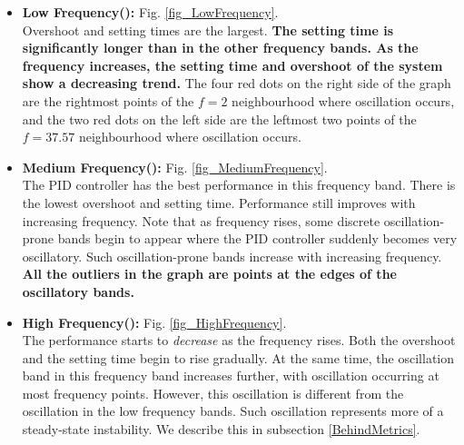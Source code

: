 \documentclass[conference]{IEEEtran}
\begin{document}
\begin{itemize}
    \item \textbf{Low Frequency():} Fig. \ref{fig_LowFrequency}.
        \\Overshoot and setting times are the largest. \textbf{The setting time is significantly longer than in the other frequency bands. As the frequency increases, the setting time and overshoot of the system show a decreasing trend.} The four red dots on the right side of the graph are the rightmost points of the $f=2$ neighbourhood where oscillation occurs, and the two red dots on the left side are the leftmost two points of the $f=37.57$ neighbourhood where oscillation occurs. 
    \item \textbf{Medium Frequency():} Fig. \ref{fig_MediumFrequency}.
        \\The PID controller has the best performance in this frequency band. There is the lowest overshoot and setting time. Performance still improves with increasing frequency. Note that as frequency rises, some discrete oscillation-prone bands begin to appear where the PID controller suddenly becomes very oscillatory. Such oscillation-prone bands increase with increasing frequency. \textbf{All the outliers in the graph are points at the edges of the oscillatory bands.}
    \item \textbf{High Frequency():} Fig. \ref{fig_HighFrequency}.
    \\
    The performance starts to \textit{decrease} as the frequency rises. Both the overshoot and the setting time begin to rise gradually. At the same time, the oscillation band in this frequency band increases further, with oscillation occurring at most frequency points. However, this oscillation is different from the oscillation in the low frequency bands. Such oscillation represents more of a steady-state instability. We describe this in subsection \ref{BehindMetrics}.
\end{itemize}
\end{document}
